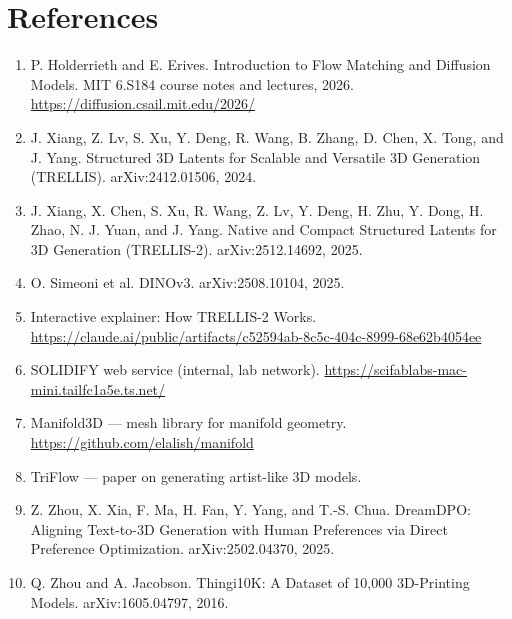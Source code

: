 \documentclass[11pt,a4paper]{article}
\begin{document}
\section*{References}
\begin{enumerate}[leftmargin=*,itemsep=3pt]
  \item P. Holderrieth and E. Erives. Introduction to Flow Matching and Diffusion Models. MIT 6.S184 course notes and lectures, 2026. \url{https://diffusion.csail.mit.edu/2026/}
  \item J. Xiang, Z. Lv, S. Xu, Y. Deng, R. Wang, B. Zhang, D. Chen, X. Tong, and J. Yang. Structured 3D Latents for Scalable and Versatile 3D Generation (TRELLIS). arXiv:2412.01506, 2024.
  \item J. Xiang, X. Chen, S. Xu, R. Wang, Z. Lv, Y. Deng, H. Zhu, Y. Dong, H. Zhao, N. J. Yuan, and J. Yang. Native and Compact Structured Latents for 3D Generation (TRELLIS-2). arXiv:2512.14692, 2025.
  \item O. Simeoni et al. DINOv3. arXiv:2508.10104, 2025.
  \item Interactive explainer: How TRELLIS-2 Works. \url{https://claude.ai/public/artifacts/c52594ab-8c5c-404c-8999-68e62b4054ee}
  \item SOLIDIFY web service (internal, lab network). \url{https://scifablabs-mac-mini.tailfc1a5e.ts.net/}
  \item Manifold3D --- mesh library for manifold geometry. \url{https://github.com/elalish/manifold}
  \item TriFlow --- paper on generating artist-like 3D models.
  \item Z. Zhou, X. Xia, F. Ma, H. Fan, Y. Yang, and T.-S. Chua. DreamDPO: Aligning Text-to-3D Generation with Human Preferences via Direct Preference Optimization. arXiv:2502.04370, 2025.
  \item Q. Zhou and A. Jacobson. Thingi10K: A Dataset of 10,000 3D-Printing Models. arXiv:1605.04797, 2016.
\end{enumerate}
\end{document}
